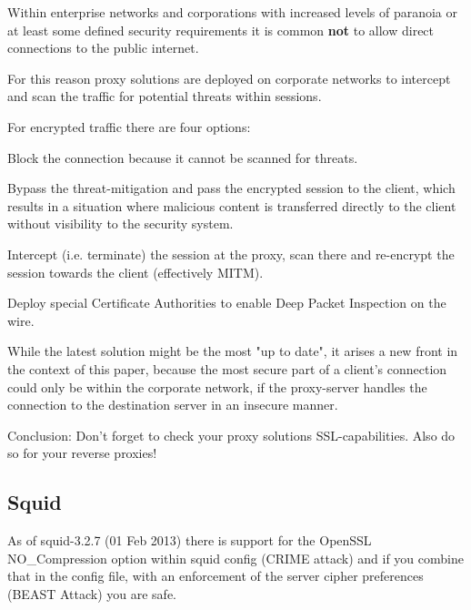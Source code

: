 \gdef\currentsectionname{Proxies}

Within enterprise networks and corporations with increased levels of paranoia or at least some defined security requirements it is common \textbf{not} to allow direct connections to the public internet.

For this reason proxy solutions are deployed on corporate networks to intercept and scan the traffic for potential threats within sessions.

For encrypted traffic there are four options:

\begin{itemize*}
  \item Block the connection because it cannot be scanned for threats.
  \item Bypass the threat-mitigation and pass the encrypted session to the client, which results in a situation where malicious content is transferred directly to the client without visibility to the security system.
  \item Intercept (i.e. terminate) the session at the proxy, scan there and re-encrypt the session towards the client (effectively MITM).
  \item Deploy special Certificate Authorities to enable Deep Packet Inspection on the wire.
\end{itemize*}

While the latest solution might be the most "up to date", it arises a new front in the context of this paper, because the most secure part of a client's connection could only be within the corporate network, if the proxy-server handles the connection to the destination server in an insecure manner.

Conclusion: Don't forget to check your proxy solutions SSL-capabilities. Also do so for your reverse proxies!

\subsection{Squid}
As of squid-3.2.7 (01 Feb 2013) there is support for the OpenSSL NO\_Compression option within squid config (CRIME attack) and if you combine that in the config file, with an enforcement of the server cipher preferences (BEAST Attack) you are safe.


